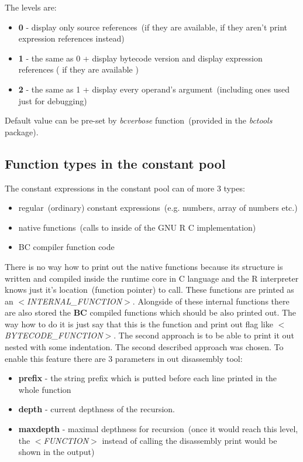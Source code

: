 \documentclass[thesis=M,english]{FITthesis}[2018/10/20]
\begin{document}
The levels are:

\begin{itemize}
	\item \textbf{0} - display only source references~(if they are available, if they aren't print expression references instead)
	\item \textbf{1} - the same as 0 + display bytecode version and display expression references ( if they are available )
	\item \textbf{2} - the same as 1 + display every operand's argument~(including ones used just for debugging)
\end{itemize}

Default value can be pre-set by \emph{bcverbose} function~(provided in the \textit{bctools} package).

\subsection{Function types in the constant pool}

The constant expressions in the constant pool can of more 3 types:

\begin{itemize}
	\item regular~(ordinary) constant expressions~(e.g. numbers, array of numbers etc.)
	\item native functions~(calls to inside of the GNU R C implementation)
	\item BC compiler function code
\end{itemize}

There is no way how to print out the native functions because its structure is written and compiled inside the runtime core in C language and the R interpreter knows just it's location~(function pointer) to call. These functions are printed as an \textit{$<$INTERNAL{\_}FUNCTION$>$}. Alongside of these internal functions there are also stored the \textbf{BC} compiled functions which should be also printed out. The way how to do it is just say that this is the function and print out flag like \textit{$<$BYTECODE{\_}FUNCTION$>$}. The second approach is to be able to print it out nested with some indentation. The second described approach was chosen. To enable this feature there are 3 parameters in out disassembly tool:

\begin{itemize}
	\item \textbf{prefix} - the string prefix which is putted before each line printed in the whole function
	
	\item \textbf{depth} - current depthness of the recursion.
 	
	\item \textbf{maxdepth} - maximal depthness for recursion~(once it would reach this level, the \textit{$<$FUNCTION$>$} instead of calling the disassembly print would be shown in the output)
\end{itemize}
\end{document}
